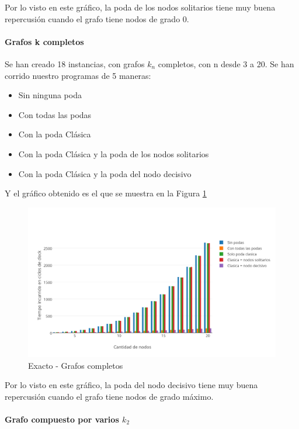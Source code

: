 Por lo visto en este gráfico, la poda de los nodos solitarios tiene muy buena repercusión cuando el grafo tiene nodos de grado 0.

\paragraph{Grafos k completos} 

Se han creado 18 instancias, con grafos $k_n$ completos, con n desde 3 a 20. Se han corrido nuestro programas de 5 maneras:

\begin{itemize}
	\item Sin ninguna poda
	\item Con todas las podas 
	\item Con la poda Clásica
	\item Con la poda Clásica y la poda de los nodos solitarios
	\item Con la poda Clásica y la poda del nodo decisivo
\end{itemize}

Y el gráfico obtenido es el que se muestra en la Figura \ref{fig:1D}

\begin{figure}[htb]
	\begin{center}
    		\includegraphics[scale=0.6]{imagenes/exacto-completos.png}
	\end{center}
	\caption{Exacto - Grafos completos}\label{fig:1D}
\end{figure}
\FloatBarrier


Por lo visto en este gráfico, la poda del nodo decisivo tiene muy buena repercusión cuando el grafo tiene nodos de grado máximo.


\paragraph{Grafo compuesto por varios $k_2$}

